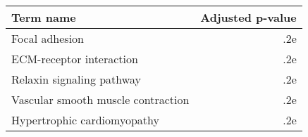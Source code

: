 \begin{tabular}{lr}
\toprule
                         Term name &  Adjusted p-value \\
\midrule
                    Focal adhesion &               .2e \\
          ECM-receptor interaction &               .2e \\
         Relaxin signaling pathway &               .2e \\
Vascular smooth muscle contraction &               .2e \\
       Hypertrophic cardiomyopathy &               .2e \\
\bottomrule
\end{tabular}

